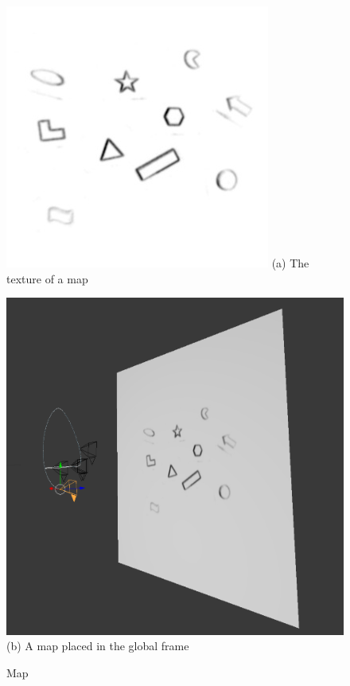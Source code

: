 \begin{figure}
  \begin{minipage}[t]{0.48\textwidth}
    \centering \includegraphics[width =
    \textwidth]{images/map_805.jpg}
    (a) The texture of a map
  \end{minipage}
  \hfill
  \begin{minipage}[t]{0.48\textwidth}
    \centering \includegraphics[width = \textwidth]{images/4.png}
    (b) A map placed in the global frame
  \end{minipage}
  \caption{Map}
  \label{fig:map}
\end{figure}


